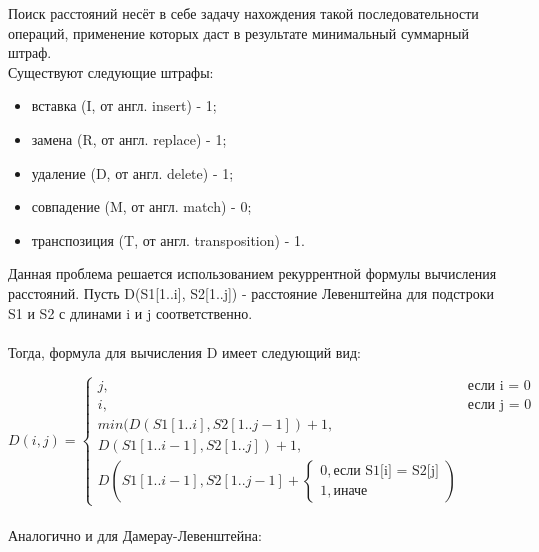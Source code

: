 \documentclass[12pt,a4paper]{report}
\begin{document}
Поиск расстояний несёт в себе задачу нахождения такой последовательности операций, применение которых 
даст в результате минимальный суммарный штраф.\\

Существуют следующие штрафы:
\begin{itemize}
    \item вставка (I, от англ. insert) - 1;
    \item замена (R, от англ. replace) - 1;
    \item удаление (D, от англ. delete) - 1;
    \item совпадение (M, от англ. match) - 0;
    \item транспозиция (T, от англ. transposition) - 1.
\end{itemize}

Данная проблема решается использованием рекуррентной формулы вычисления расстояний. Пусть D(S1[1..i], 
S2[1..j]) - расстояние Левенштейна для подстроки S1 и S2 с длинами i и j соответственно.\\\\

Тогда, формула для вычисления D имеет следующий вид:

\begin{displaymath}
    D(i,j) = \left\{ 
        \begin{array}{ll}
            j, & \textrm{если i = 0} \\
            i, & \textrm{если j = 0} \\
            min(D(S1[1..i], S2[1..j-1]) + 1,\\
                D(S1[1..i-1], S2[1..j]) + 1,\\
                D(S1[1..i-1], S2[1..j-1] + \left \{ 
                \begin{array}{ll}
                    0, \textrm{если S1[i] = S2[j]} \\ 
                    1, \textrm{иначе}
                \end{array} \right.
            )
        \end{array} \right.
\end{displaymath} \\

Аналогично и для Дамерау-Левенштейна:
\end{document}
